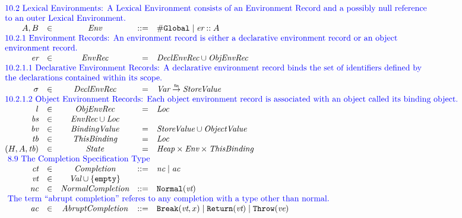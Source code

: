 \[
\begin{array}{rlcrll}

\multicolumn{6}{l}{\inblue
\mbox{10.2 Lexical Environments:
A Lexical Environment consists of an Environment Record and a possibly null reference}}\\
\multicolumn{6}{l}{\inblue
\mbox{to an outer Lexical Environment.}}\\

A, B & \in & \Env & ::= & \lg \mid \mkst{\emph{er}}A\\

\multicolumn{6}{l}{\inblue
\mbox{10.2.1 Environment Records:
An environment record is either a declarative environment record or an object}}\\
\multicolumn{6}{l}{\inblue
\mbox{environment record.}}\\

\emph{er} & \in & \emph{EnvRec} & = & \emph{DeclEnvRec} \cup \emph{ObjEnvRec}\\

\multicolumn{6}{l}{\inblue
\mbox{10.2.1.1 Declarative Environment Records:
A declarative environment record binds the set of identifiers defined by}}\\
\multicolumn{6}{l}{\inblue
\mbox{the declarations contained within its scope.}}\\
\er & \in & \emph{DeclEnvRec} & = & \Var \finto \sv&\\

\multicolumn{6}{l}{\inblue
\mbox{10.2.1.2 Object Environment Records:
Each object environment record is associated with an object called its binding object.}}\\
l & \in & \emph{ObjEnvRec} & = & \Loc\\

\emph{bs} & \in & \emph{EnvRec} \cup \Loc\\

\emph{bv} & \in & \emph{BindingValue} & = & \emph{StoreValue} \cup \emph{ObjectValue}\\


\tb &\in&\emph{ThisBinding} & = & \Loc\\
\state &\in&\State & = & \Heap \times \Env \times \emph{ThisBinding}\\

\multicolumn{6}{l}{\inblue\mbox{
8.9 The Completion Specification Type}}\\
\emph{ct}&\in&\emph{Completion} &::=& \emph{nc} \mid \emph{ac}\\
\vorempty&\in&\Val \cup \{{\tt empty}\}\\
\emph{nc}&\in&\emph{NormalCompletion} &::=& {\tt Normal}(\vorempty)\\

\multicolumn{6}{l}{\inblue\mbox{
The term ``abrupt completion'' referes to any completion with a type other than normal.}}\\
\emph{ac}&\in&\emph{AbruptCompletion} &::=&
{\tt Break}(\vorempty, x) \mid
{\tt Return}(\vorempty) \mid
{\tt Throw}(\emph{ve})\\
\end{array}
\]

